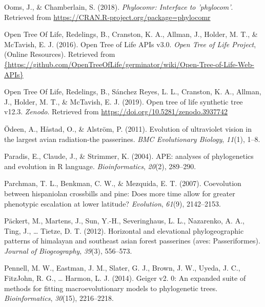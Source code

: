 \documentclass[english,man]{apa6}
\begin{document}
\leavevmode\hypertarget{ref-Ooms2018}{}%
Ooms, J., \& Chamberlain, S. (2018). \emph{Phylocomr: Interface to 'phylocom'}. Retrieved from \url{https://CRAN.R-project.org/package=phylocomr}

\leavevmode\hypertarget{ref-opentreeAPIs}{}%
Open Tree Of Life, Redelings, B., Cranston, K. A., Allman, J., Holder, M. T., \& McTavish, E. J. (2016). Open Tree of Life APIs v3.0. \emph{Open Tree of Life Project}, (Online Resources). Retrieved from \href{\%7Bhttps://github.com/OpenTreeOfLife/germinator/wiki/Open-Tree-of-Life-Web-APIs\%7D}{\{https://github.com/OpenTreeOfLife/germinator/wiki/Open-Tree-of-Life-Web-APIs\}}

\leavevmode\hypertarget{ref-opentreeoflife2019synth}{}%
Open Tree Of Life, Redelings, B., Sánchez Reyes, L. L., Cranston, K. A., Allman, J., Holder, M. T., \& McTavish, E. J. (2019). Open tree of life synthetic tree v12.3. \emph{Zenodo}. Retrieved from \url{https://doi.org/10.5281/zenodo.3937742}

\leavevmode\hypertarget{ref-odeen2011evolution}{}%
Ödeen, A., Håstad, O., \& Alström, P. (2011). Evolution of ultraviolet vision in the largest avian radiation-the passerines. \emph{BMC Evolutionary Biology}, \emph{11}(1), 1--8.

\leavevmode\hypertarget{ref-paradis2004}{}%
Paradis, E., Claude, J., \& Strimmer, K. (2004). APE: analyses of phylogenetics and evolution in R language. \emph{Bioinformatics}, \emph{20}(2), 289--290.

\leavevmode\hypertarget{ref-parchman2007coevolution}{}%
Parchman, T. L., Benkman, C. W., \& Mezquida, E. T. (2007). Coevolution between hispaniolan crossbills and pine: Does more time allow for greater phenotypic escalation at lower latitude? \emph{Evolution}, \emph{61}(9), 2142--2153.

\leavevmode\hypertarget{ref-packert2012horizontal}{}%
Päckert, M., Martens, J., Sun, Y.-H., Severinghaus, L. L., Nazarenko, A. A., Ting, J., \ldots{} Tietze, D. T. (2012). Horizontal and elevational phylogeographic patterns of himalayan and southeast asian forest passerines (aves: Passeriformes). \emph{Journal of Biogeography}, \emph{39}(3), 556--573.

\leavevmode\hypertarget{ref-pennell2014geiger}{}%
Pennell, M. W., Eastman, J. M., Slater, G. J., Brown, J. W., Uyeda, J. C., FitzJohn, R. G., \ldots{} Harmon, L. J. (2014). Geiger v2. 0: An expanded suite of methods for fitting macroevolutionary models to phylogenetic trees. \emph{Bioinformatics}, \emph{30}(15), 2216--2218.
\end{document}
